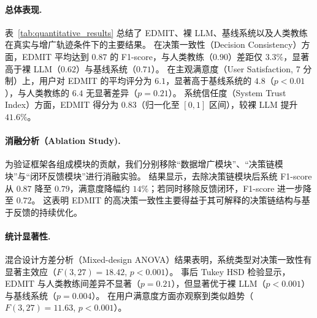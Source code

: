 \documentclass[sigconf]{acmart}
\begin{document}
\paragraph{总体表现.}
表~\ref{tab:quantitative_results} 总结了 \textsc{EDMIT}、裸 LLM、基线系统以及人类教练在真实与增广轨迹条件下的主要结果。
在决策一致性（Decision Consistency）方面，\textsc{EDMIT} 平均达到 $0.87$ 的 F1-score，与人类教练（$0.90$）差距仅 $3.3\%$，显著高于裸 LLM（$0.62$）与基线系统（$0.71$）。
在主观满意度（User Satisfaction, 7 分制）上，用户对 \textsc{EDMIT} 的平均评分为 $6.1$，显著高于基线系统的 $4.8$（$p < 0.01$），与人类教练的 $6.4$ 无显著差异（$p = 0.21$）。
系统信任度（System Trust Index）方面，\textsc{EDMIT} 得分为 $0.83$（归一化至 $[0,1]$ 区间），较裸 LLM 提升 $41.6\%$。

\begin{table}[t]
  \centering
  \caption{不同系统在主要指标上的对比结果（模拟数据）。}
  \label{tab:quantitative_results}
  \setlength{\tabcolsep}{2.2mm}
  \renewcommand{\arraystretch}{1.15}
\end{table}

\paragraph{消融分析（Ablation Study).}
为验证框架各组成模块的贡献，我们分别移除“数据增广模块”、“决策链模块”与“闭环反馈模块”进行消融实验。
结果显示，去除决策链模块后系统 F1-score 从 $0.87$ 降至 $0.79$，满意度降幅约 $14\%$；若同时移除反馈闭环，F1-score 进一步降至 $0.72$。
这表明 \textsc{EDMIT} 的高决策一致性主要得益于其可解释的决策链结构与基于反馈的持续优化。

\paragraph{统计显著性.}
混合设计方差分析（Mixed-design ANOVA）结果表明，系统类型对决策一致性有显著主效应（$F(3,27)=18.42$, $p<0.001$）。
事后 Tukey HSD 检验显示，\textsc{EDMIT} 与人类教练间差异不显著（$p=0.21$），但显著优于裸 LLM（$p<0.001$）与基线系统（$p=0.004$）。
在用户满意度方面亦观察到类似趋势（$F(3,27)=11.63$, $p<0.001$）。
\end{document}

